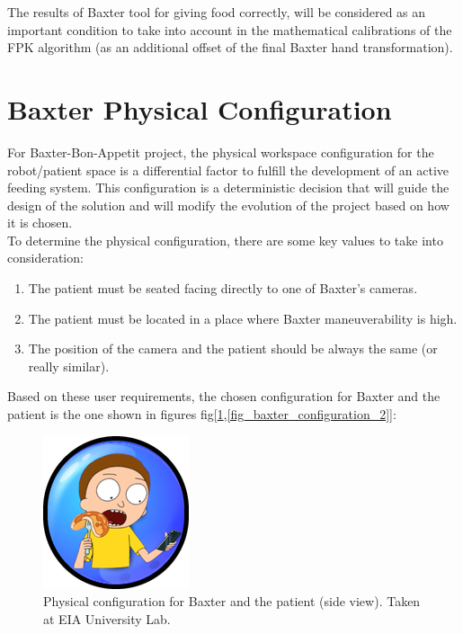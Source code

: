 \documentclass[11pt]{report} %
\begin{document}
The results of Baxter tool for giving food correctly, will be considered as an important condition to take into account in the mathematical calibrations of the FPK algorithm (as an additional offset of the final Baxter hand transformation).\\

\section{Baxter Physical Configuration}

For Baxter-Bon-Appetit project, the physical workspace configuration for the robot/patient space is a differential factor to fulfill the development of an active feeding system. This configuration is a deterministic decision that will guide the design of the solution and will modify the evolution of the project based on how it is chosen.\\

To determine the physical configuration, there are some key values to take into consideration:

\begin{enumerate}
    \item The patient must be seated facing directly to one of Baxter's cameras.
    \item The patient must be located in a place where Baxter maneuverability is high.
    \item The position of the camera and the patient should be always the same (or really similar).
\end{enumerate}

Based on these user requirements, the chosen configuration for Baxter and the patient is the one shown in figures fig[\ref{fig_baxter_configuration_1},\ref{fig_baxter_configuration_2}]:

\begin{figure}[H]
    \centering
    \includegraphics[width=0.3\linewidth]{assets/imgs/TODO.png}
    \caption{Physical configuration for Baxter and the patient (side view). Taken at EIA University Lab.} 
    \label{fig_baxter_configuration_1}
\end{figure}
\end{document}
